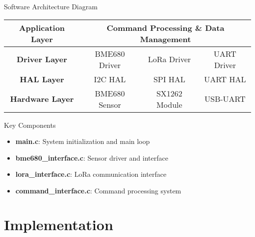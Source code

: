 \documentclass[aspectratio=169]{beamer}
\begin{document}
\begin{frame}{Software Architecture Diagram}
\begin{center}
\begin{tabular}{|c|c|c|c|}
\hline
\textbf{Application Layer} & \multicolumn{3}{c|}{Command Processing \& Data Management} \\
\hline
\textbf{Driver Layer} & BME680 Driver & LoRa Driver & UART Driver \\
\hline
\textbf{HAL Layer} & I2C HAL & SPI HAL & UART HAL \\
\hline
\textbf{Hardware Layer} & BME680 Sensor & SX1262 Module & USB-UART \\
\hline
\end{tabular}
\end{center}

\begin{block}{Key Components}
\begin{itemize}
    \item \textbf{main.c}: System initialization and main loop
    \item \textbf{bme680\_interface.c}: Sensor driver and interface
    \item \textbf{lora\_interface.c}: LoRa communication interface
    \item \textbf{command\_interface.c}: Command processing system
\end{itemize}
\end{block}
\end{frame}

\section{Implementation}
\end{document}
